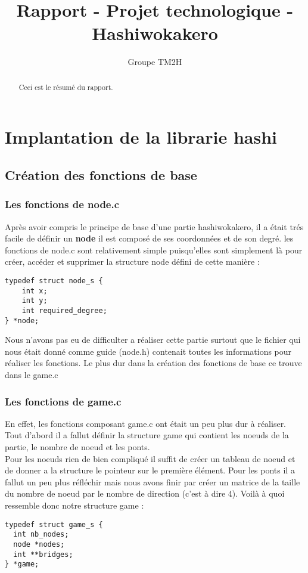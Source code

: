 \documentclass[12pt]{report}
\title{Rapport - Projet technologique - Hashiwokakero}
\author{Groupe TM2H}
\begin{document}
\maketitle

\begin{abstract}
Ceci est le résumé du rapport.
\end{abstract}

\tableofcontents

\chapter{Implantation de la librarie hashi}

\section{Création des fonctions de base}

\subsection{Les fonctions de node.c}
\textnormal{Après avoir compris le principe de base d'une partie hashiwokakero, il a était trés facile de définir un \textbf{node} il est composé de ses coordonnées et de son degré. les fonctions de node.c sont relativement simple puisqu'elles sont simplement là pour créer, accéder et supprimer la structure node défini de cette manière :}
\begin{verbatim}
typedef struct node_s {
	int x;
	int y;
	int required_degree;
} *node;
\end{verbatim}

\textnormal{Nous n'avons pas eu de difficulter a réaliser cette partie surtout que le fichier qui nous était donné comme guide (node.h) contenait toutes les informations pour réaliser les fonctions. Le plus dur dans la création des fonctions de base ce trouve dans le game.c}

\subsection{Les fonctions de game.c}
\textnormal{En effet, les fonctions composant game.c ont était un peu plus dur à réaliser. Tout d'abord il a fallut définir la structure game qui contient les noeuds de la partie, le nombre de noeud et les ponts.\\ Pour les noeuds rien de bien compliqué il suffit de créer un tableau de noeud et de donner a la structure le pointeur sur le première élément. Pour les ponts il a fallut un peu plus réfléchir mais nous avons finir par créer un matrice de la taille du nombre de noeud par le nombre de direction (c'est à dire 4). Voilà à quoi ressemble donc notre structure game :}
\begin{verbatim}
typedef struct game_s {
  int nb_nodes;
  node *nodes; 
  int **bridges;
} *game;
\end{verbatim}
\end{document}

